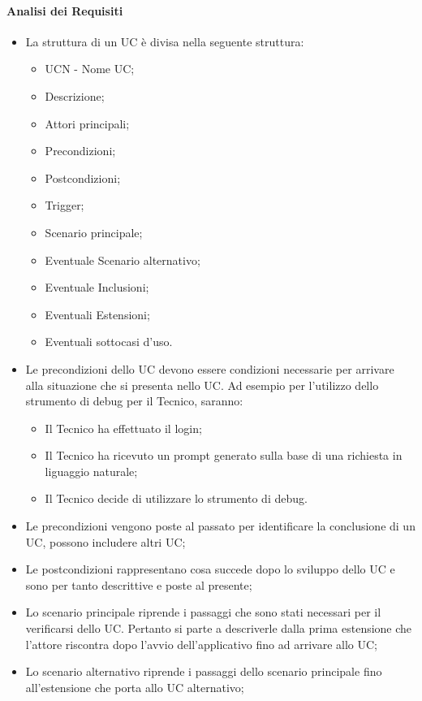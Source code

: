 \paragraph{Analisi dei Requisiti}
\begin{itemize}
  \item La struttura di un UC è divisa nella seguente struttura:
  \begin{itemize}
    \item UCN - Nome UC;
    \item Descrizione;
    \item Attori principali;
    \item Precondizioni;
    \item Postcondizioni;
    \item Trigger;
    \item Scenario principale;
    \item Eventuale Scenario alternativo;
    \item Eventuale Inclusioni;
    \item Eventuali Estensioni;
    \item Eventuali sottocasi d'uso.
  \end{itemize}
  \item Le precondizioni dello UC devono essere condizioni necessarie per arrivare alla situazione che si presenta nello UC. Ad esempio per l'utilizzo dello strumento di debug per il Tecnico, saranno:
  \begin{itemize}
    \item Il Tecnico ha effettuato il login;
    \item Il Tecnico ha ricevuto un prompt generato sulla base di una richiesta in liguaggio naturale;
    \item Il Tecnico decide di utilizzare lo strumento di debug.
  \end{itemize}
  \item Le precondizioni vengono poste al passato per identificare la conclusione di un UC, possono includere altri UC;
  \item Le postcondizioni rappresentano cosa succede dopo lo sviluppo dello UC e sono per tanto descrittive e poste al presente;
  \item Lo scenario principale riprende i passaggi che sono stati necessari per il verificarsi dello UC. Pertanto si parte a descriverle dalla prima estensione che l'attore riscontra dopo l'avvio dell'applicativo fino ad arrivare allo UC;
  \item Lo scenario alternativo riprende i passaggi dello scenario principale fino all'estensione che porta allo UC alternativo;

\end{itemize}
